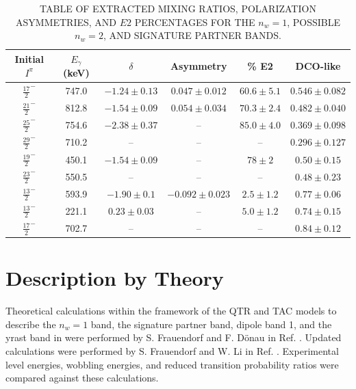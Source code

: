 \begin{table}[t]
\begin{center}
\caption{TABLE OF EXTRACTED MIXING RATIOS, POLARIZATION ASYMMETRIES, AND $E2$ PERCENTAGES FOR THE $n_w=1$, POSSIBLE $n_w=2$, AND SIGNATURE PARTNER BANDS.\label{tbl:chp4-mixing-asym}}
\centering
\begin{tabular}{|c|c|c|c|c|c|}
\toprule
Initial $I^\pi{}$ &$E_{\gamma}$ (keV) &$\delta$ & Asymmetry & \% E2 & DCO-like\\
\midrule
$\frac{17}{2}^-$ & 747.0 & $-1.24\pm0.13$ & $0.047\pm0.012$ & $60.6\pm5.1$ & $0.546\pm0.082$\\
$\frac{21}{2}^-$ & 812.8 & $-1.54\pm0.09$ & $0.054\pm0.034$ & $70.3\pm2.4$ & $0.482\pm0.040$\\
$\frac{25}{2}^-$ & 754.6 & $-2.38\pm0.37$ & -- & $85.0\pm4.0$ & $0.369\pm0.098$\\
$\frac{29}{2}^-$ & 710.2 & -- & -- & -- & $0.296\pm0.127$\\
\midrule
$\frac{19}{2}^-$ & 450.1 & $-1.54\pm0.09$ & -- & $78\pm2$ & $0.50\pm0.15$\\
$\frac{23}{2}^-$ & 550.5 & -- & -- & -- & $0.48\pm0.23$\\
\midrule
$\frac{13}{2}^-$ & 593.9 & $-1.90\pm0.1$ & $-0.092\pm{}0.023$ & $2.5\pm1.2$ & $0.77\pm0.06$\\
$\frac{13}{2}^-$ & 221.1 & $0.23\pm0.03$ & -- & $5.0\pm1.2$ & $0.74\pm0.15$\\
$\frac{17}{2}^-$ & 702.7 & -- & -- & -- & $0.84\pm0.12$\\
\bottomrule
\end{tabular}
\end{center}
\end{table}

\section{Description by Theory}
\label{sec:trw-theory-desc}
Theoretical calculations within the framework of the QTR and TAC models to describe the $n_w=1$ band, the signature partner band, dipole band 1, and the yrast band in \pr{} were performed by S. Frauendorf and F. D\"onau in Ref. \cite{frauendorfTransverseWobbling}. Updated calculations were performed by S. Frauendorf and W. Li in Ref. \cite{mattaTransversePRL}. Experimental level energies, wobbling energies, and reduced transition probability ratios were compared against these calculations.

